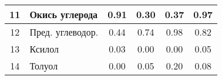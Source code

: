 \begin{table}[H]
\begin{tabularx}{\linewidth}{|c|X|c|c|c|c|}
        11                          & Окись углерода                     & 0.91                              & 0.30          & 0.37           & 0.97            \\ \hline
        12                          & Пред. углеводор.                   & 0.44                              & 0.74          & 0.98           & 0.82            \\ \hline
        13                          & Ксилол                             & 0.03                              & 0.00          & 0.00           & 0.05            \\ \hline
        14                          & Толуол                             & 0.00                              & 0.05          & 0.20           & 0.08            \\ \hline
    \end{tabularx}
\end{table}



